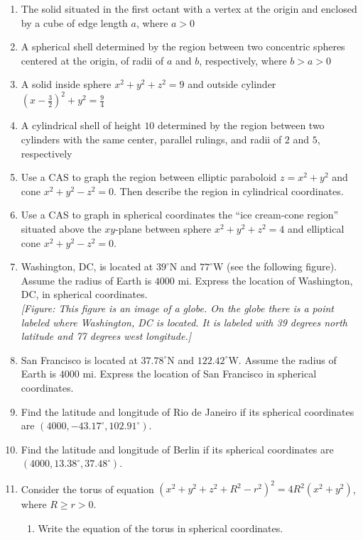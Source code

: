 \documentclass{exercises}
\begin{document}
\begin{enumerate}[resume]
\item The solid situated in the first octant with a vertex at the origin and enclosed by a cube of edge length $a$, where $a>0$
\item A spherical shell determined by the region between two concentric spheres centered at the origin, of radii of $a$ and $b$, respectively, where $b>a>0$
\item A solid inside sphere $x^{2}+y^{2}+z^{2}=9$ and outside cylinder ${(x-\frac{3}{2})}^{2}+y^{2}=\frac{9}{4}$
\item A cylindrical shell of height $10$ determined by the region between two cylinders with the same center, parallel rulings, and radii of $2$ and $5$, respectively
\item \techrequired Use a CAS to graph the region between elliptic paraboloid $z=x^{2}+y^{2}$ and cone $x^{2}+y^{2}-z^{2}=0$. Then describe the region in cylindrical coordinates.
\item \techrequired Use a CAS to graph in spherical coordinates the ``ice cream-cone region'' situated above the $xy$-plane between sphere $x^{2}+y^{2}+z^{2}=4$ and elliptical cone $x^{2}+y^{2}-z^{2}=0$.
\item Washington, DC, is located at $39^\circ \text{N}$ and $77^\circ \text{W}$ (see the following figure). Assume the radius of Earth is $4000$ mi. Express the location of Washington, DC, in spherical coordinates. \\ \textit{[Figure: This figure is an image of a globe. On the globe there is a point labeled where Washington, DC is located. It is labeled with 39 degrees north latitude and 77 degrees west longitude.]}
\item San Francisco is located at $37.78^\circ \text{N}$ and $122.42^\circ \text{W}$. Assume the radius of Earth is $4000$ mi. Express the location of San Francisco in spherical coordinates.
\item Find the latitude and longitude of Rio de Janeiro if its spherical coordinates are $(4000,-43.17^\circ,102.91^\circ)$.
\item Find the latitude and longitude of Berlin if its spherical coordinates are $(4000,13.38^\circ,37.48^\circ)$.
\item \techrequired Consider the torus of equation ${(x^{2}+y^{2}+z^{2}+R^{2}-r^{2})}^{2}=4R^{2}(x^{2}+y^{2})$, where $R\ge r>0$.
\begin{enumerate}[label=(\alph*)]
  \item Write the equation of the torus in spherical coordinates.

\end{enumerate}
\end{enumerate}
\end{document}
